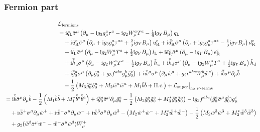 \documentclass[CheatSheet]{subfiles}
\begin{document}
\subsubsection{Fermion part}
\begin{align}
 \begin{split}
  &\mathcal L\w{fermions}\\
&=
    \ii\bqL\bsigma^\mu \left(\partial_\mu - \ii g_3 g_\mu^a\tau^a - \ii g_2 W_\mu^a T^a - \tfrac16 \ii g_Y B_\mu\right)\qL
\\&\quad
 +  \ii\buR^\cc\bsigma^\mu \left(\partial_\mu + \ii g_3 g_\mu^a\tau^{a*} + \tfrac23 \ii g_Y B_\mu\right)\uR^\cc
 +  \ii\bdR^\cc\bsigma^\mu\left(\partial_\mu + \ii g_3 g_\mu^a\tau^{a*} - \tfrac13 \ii g_Y B_\mu\right)\dR^\cc
\\&\quad
 +  \ii\blL\bsigma^\mu \left(\partial_\mu - \ii g_2 W_\mu^aT^a + \tfrac12 \ii g_Y B_\mu\right)\lL
 +  \ii\beR^\cc\bsigma^\mu\left(\partial_\mu - \ii g_Y B_\mu\right)\eR^\cc
\\&\quad
 +  \ii\bthu\bsigma^\mu\left(\partial_\mu - \ii g_2 W_\mu^aT^a - \tfrac12 \ii g_Y B_\mu\right)\thu
 +  \ii\bthd\bsigma^\mu\left(\partial_\mu - \ii g_2 W_\mu^aT^a + \tfrac12 \ii g_Y B_\mu\right)\thd
\\&\quad
 + \ii\bar{\tig}_0^a\bsigma^\mu\left(\partial_\mu\tig_0^a + g_3f^{abc}g_\mu^b\tig_0^c\right)
 + \ii\bar{\tiw}^a\bsigma^\mu\left(\partial_\mu\tiw^a + g_2\nep^{abc}W^b_\mu\tiw^c\right)
 + \ii\bar{\tib}\bsigma^\mu\partial_\mu\tib
\\&\quad
 - \frac12\left(M_3\tig_0^a\tig_0^a+M_2\tiw^a\tiw^a+M_1\tib\tib+\text{H.c.}\right)
 + \mathcal L\w{super}\big|_{\text{no $F$-terms}}
 \end{split}
\\
\begin{split}
&=
 \ii\bar{\tib}\bsigma^\mu\partial_\mu\tib - \frac12\left(M_1\tib\tib+M_1^*\bar{\tib}^a\bar{\tib}^a\right)
 + \ii\bar{\tig}_0^a\bsigma^\mu\partial_\mu\tig_0^a - \frac12\left(M_3\tig_0^a\tig_0^a+M_3^*\bar{\tig}_0^a\bar{\tig}_0^a\right)
 - \ii g_3 f^{abc} (\bar{\tig}_0^a\bsigma^\mu\tig_0^b) g_\mu^c
\\&\quad
 + \ii\bar{\tiw}^+\bsigma^\mu \partial_\mu\tiw^+
 + \ii\bar{\tiw}^-\bsigma^\mu \partial_\mu\tiw^-
 + \ii\bar{\tiw}^3\bsigma^\mu \partial_\mu\tiw^3
 -\left(M_2\tiw^+\tiw^- + M_2^*\bar{\tiw}^+\bar{\tiw}^-\right)
 -\frac12\left(M_2\tiw^3\tiw^3 + M_2^*\bar{\tiw}^3\bar{\tiw}^3\right)
\\&\quad
 + g_2(\bar{\tiw}^{3}\bsigma^\mu\tiw^{-} - \bar{\tiw}^{+}\bsigma^\mu\tiw^{3})W_{\mu}^{+}

\end{split}
\end{align}
\end{document}
